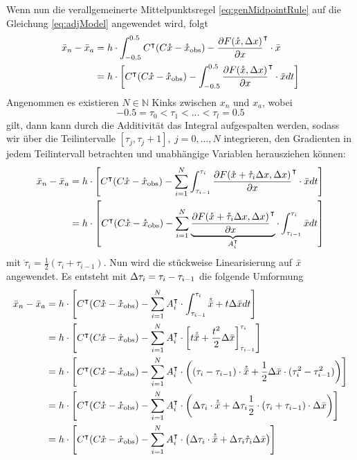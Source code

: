 Wenn nun die verallgemeinerte Mittelpunktsregel \eqref{eq:genMidpointRule} auf die Gleichung \eqref{eq:adjModel} angewendet wird, folgt
\begin{align*}
\bar{x}_n - \bar{x}_a &= h\cdot \int_{-0.5}^{0.5}C^\intercal(C\mathring{x}-\mathring{x}_{\text{obs}}) - \frac{\partial F(\mathring{x},\Delta x)}{\partial x}^\intercal \cdot \bar{x}\\
									&= h\cdot \left[C^\intercal(C\mathring{x}-\mathring{x}_{\text{obs}}) - \int_{-0.5}^{0.5} \frac{\partial F(\mathring{x} ,\Delta x)}{\partial x}^\intercal \cdot \bar{x} dt\right]\\
\end{align*}
Angenommen es existieren $N \in \mathbb{N}$ Kinks zwischen $x_n$ und $x_{a}$, wobei \[-0.5 = \tau_0 <\tau_1 <\ldots < \tau_l=0.5\] gilt, dann kann durch die Additivität das Integral aufgespalten werden, sodass wir über die Teilintervalle $[\tau_j,\tau_j+1],~ j=0,\ldots,N$ integrieren, den Gradienten in jedem Teilintervall betrachten und unabhängige Variablen herausziehen können:
\begin{align*}
\bar{x}_n - \bar{x}_a &= h\cdot \left[ C^\intercal(C\mathring{x}-\mathring{x}_{\text{obs}}) - \sum_{i=1}^N \int_{\tau_{i-1}}^{\tau_{i}}\frac{\partial F(\mathring{x}+\mathring \tau_i\Delta x,\Delta x)}{\partial x}^\intercal \cdot \bar{x} dt\right]\\
									&= h\cdot \left[C^\intercal(C\mathring{x} -\mathring{x}_{\text{obs}}) - \sum_{i=1}^N \underbrace{\frac{\partial F(\mathring{x}+\mathring \tau_i\Delta x,\Delta x)}{\partial x}^\intercal }_{A_i^\intercal} \cdot \int_{\tau_{i-1}}^{\tau_{i}} \bar{x} dt\right]\\
\end{align*}
mit $\mathring \tau_i=\frac{1}{2}(\tau_i+\tau_{i-1})$.
Nun wird die stückweise Linearisierung auf $\bar{x}$ angewendet. Es entsteht mit $\Delta \tau_i=\tau_i-\tau_{i-1}$ die folgende Umformung
\allowdisplaybreaks
\begin{align*}
\bar{x}_n - \bar{x}_a &= h\cdot \left[C^\intercal(C\mathring{x} -\mathring{x}_{\text{obs}}) - \sum_{i=1}^N A_i^\intercal \cdot \int_{\tau_{i-1}}^{\tau_{i}} \mathring{\bar{x}} + t\Delta \bar{x} dt\right]\\
		  &= h\cdot \left[C^\intercal(C\mathring{x} -\mathring{x}_{\text{obs}}) - \sum_{i=1}^N A_i^\intercal \cdot \left[t\mathring{\bar{x}} + \frac{t^2}{2}\Delta \bar{x} \right]_{\tau_{i-1}}^{\tau_i} \right]\\
		  &= h\cdot \left[C^\intercal(C\mathring{x} -\mathring{x}_{\text{obs}}) - \sum_{i=1}^N A_i^\intercal \cdot \left( (\tau_i - \tau_{i-1})\cdot \mathring{\bar{x}} + \frac{1}{2}\Delta \bar{x} \cdot(\tau_i^2-\tau_{i-1}^2) \right)\right]\\
		  &= h\cdot \left[C^\intercal(C\mathring{x} -\mathring{x}_{\text{obs}}) - \sum_{i=1}^N A_i^\intercal \cdot \left(\Delta \tau_i\cdot \mathring{\bar{x}} +  \Delta \tau_i \frac{1}{2}\cdot(\tau_i+\tau_{i-1})\cdot \Delta \bar{x} \right)\right]\\
		  &= h\cdot \left[C^\intercal(C\mathring{x} -\mathring{x}_{\text{obs}}) - \sum_{i=1}^N A_i^\intercal \cdot \left( \Delta \tau_i\cdot \mathring{\bar{x}} +  \Delta \tau_i \mathring{\tau}_i \Delta \bar{x} \right)\right]
\end{align*}

